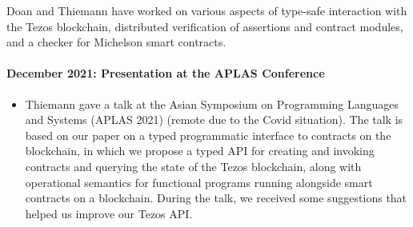 \documentclass[a4paper,11pt]{article}
\begin{document}
Doan and Thiemann have worked on various aspects of type-safe interaction with the Tezos blockchain, distributed verification of assertions and contract modules, and a checker for Michelson smart contracts.

\paragraph{December 2021: Presentation at the APLAS Conference} 

\begin{itemize}
\item Thiemann gave a talk at the Asian Symposium on Programming Languages and Systems (APLAS 2021) (remote due to the Covid situation). The talk is based on our paper on a typed programmatic interface to contracts on the blockchain, in which we propose a typed API for creating and invoking contracts and querying the state of the Tezos blockchain, along with operational semantics for functional programs running alongside smart contracts on a blockchain. During the talk, we received some suggestions that helped us improve our Tezos API.
\end{itemize}

 
\end{document}
